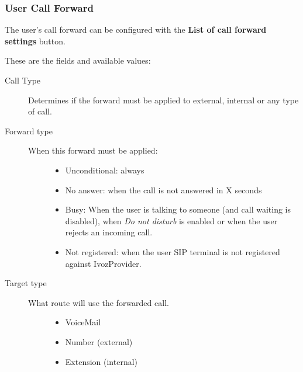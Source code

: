 \documentclass[letterpaper,10pt,english]{sphinxmanual}
\begin{document}
\subsubsection{User Call Forward}
\label{administration_portal/client/vpbx/users:user-call-forward}
The user's call forward can be configured with the \textbf{List of call forward settings}  button.

These are the fields and available values:
\begin{description}
\item[{Call Type}] \leavevmode{}\label{administration_portal/client/vpbx/users:term-call-type}
Determines if the forward must be applied to external, internal or any
type of call.

\item[{Forward type}] \leavevmode{}\label{administration_portal/client/vpbx/users:term-forward-type}\begin{description}
\item[{When this forward must be applied:}] \leavevmode\begin{itemize}
\item {} 
Unconditional: always

\item {} 
No answer: when the call is not answered in X seconds

\item {} 
Busy: When the user is talking to someone (and call waiting is
disabled), when \emph{Do not disturb} is enabled or when the user
rejects an incoming call.

\item {} 
Not registered: when the user SIP terminal is not registered
against IvozProvider.

\end{itemize}

\end{description}

\item[{Target type}] \leavevmode{}\label{administration_portal/client/vpbx/users:term-target-type}\begin{description}
\item[{What route will use the forwarded call.}] \leavevmode\begin{itemize}
\item {} 
VoiceMail

\item {} 
Number (external)

\item {} 
Extension (internal)

\end{itemize}

\end{description}

\end{description}
\end{document}
